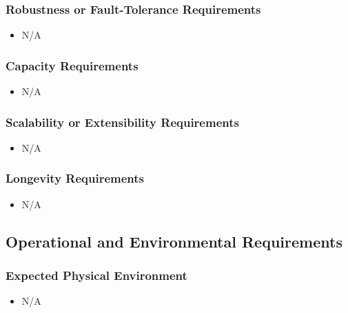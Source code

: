 \documentclass[12pt]{article}
\newcounter{nfrnum} %
\begin{document}
  \subsubsection{Robustness or Fault-Tolerance Requirements}
    \noindent\begin{itemize}
		\item N/A
    \end{itemize}
  \subsubsection{Capacity Requirements}
    \noindent\begin{itemize}
		\item N/A
    \end{itemize}
  \subsubsection{Scalability or Extensibility Requirements}
    \noindent\begin{itemize}
		\item N/A
    \end{itemize}
  \subsubsection{Longevity Requirements}
    \noindent\begin{itemize}
		\item N/A
    \end{itemize}

\subsection{Operational and Environmental Requirements}
  \subsubsection{Expected Physical Environment}
    \noindent\begin{itemize}
		\item N/A
    \end{itemize}
\end{document}
